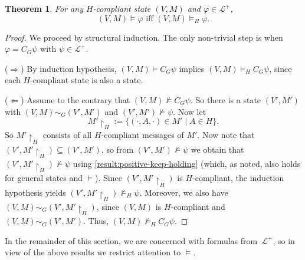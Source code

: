 \documentclass{article}
\newcounter{#1}
\newtheorem{theorem}{Theorem}[section]
\newcommand{\state}[1][]{\ensuremath{(V#1,M#1)}\xspace}
\newcommand{\msg}[3]{\ensuremath{(#1,#2,#3)}\xspace}
\newcommand{\ck}[1]{\ensuremath{C_{#1}}\xspace}\newcommand{\Facts}{\mathit{Facts}}
\renewcommand{\enspace}{}
\begin{document}
\begin{theorem}
  \label{result:ck-of-h-doesnt-matter}
  For any $H$-compliant state $\state$ and $\varphi\in\mathcal{L}^+$,
\[
\mbox{$\state\vDash\varphi$ iff $\state\vDash_H\varphi$.}
\]
\end{theorem}
\begin{proof}
  We proceed by structural induction.
  The only non-trivial step is when $\varphi=\ck G\psi$ with $\psi\in\mathcal{L}^+$.
  
  \noindent ($\Rightarrow$) By induction hypothesis, $\state\vDash\ck G\psi$ implies $\state\vDash_H\ck G\psi$,
  since each $H$-compliant state is also a state.

  \noindent ($\Leftarrow$) Assume to the contrary that
  $\state\nvDash\ck G\psi$.
  So there is
  a state $\state[']$ with $\state\sim_G \state[']$ and $ \state[']\nvDash\psi$.
  Now let
  \[
  M'\restriction_H:=\{\msg{\cdot}{A}{\cdot} \in M' \mid A\in H\}\enspace.
  \]
  So $M'\restriction_H$ consists of all $H$-compliant messages of $M'$.
  Now note that $( V', M'\restriction_H)\subseteq \state[']$,
  so from $ \state[']\nvDash\psi$
  we obtain that $(V', M'\restriction_H)\nvDash\psi$
  using \cref{result:positive-keep-holding} (which, as noted, also holds for general states and $\vDash$).
  Since $( V', M'\restriction_H)$ is $H$-compliant, 
  the induction hypothesis yields $(V', M'\restriction_H)\nvDash_H\psi$.
  Moreover, we also have $\state\sim_G(V', M'\restriction_H)$,
  since \state is $H$-compliant and $\state\sim_G \state[']$.
  Thus, $\state\nvDash_H\ck G\psi$.
\end{proof}

In the remainder of this section, we are concerned with formulas from~$\mathcal{L}^+$,
so in view of the above results we restrict attention to $\vDash$.
\end{document}
